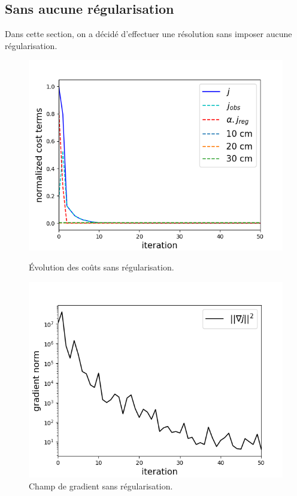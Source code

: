 \documentclass{article}
\begin{document}
\subsection{Sans aucune régularisation}


Dans cette section, on a décidé d'effectuer une résolution sans imposer aucune régularisation. 





\begin{figure}[H]
    \centering
    \begin{minipage}[b]{0.45\linewidth}
        \centering
        \includegraphics[width=\linewidth]{Images_Ayoub/No_Regularisation/Costs.png}
        \caption{Évolution des coûts sans régularisation.}
        \label{fig:costs}
    \end{minipage}
    \hfill
    \begin{minipage}[b]{0.45\linewidth}
        \centering
        \includegraphics[width=\linewidth]{Images_Ayoub/No_Regularisation/Gradient.png}
        \caption{Champ de gradient sans régularisation.}
        \label{fig:gradient}
    \end{minipage}


\end{figure}
\end{document}
